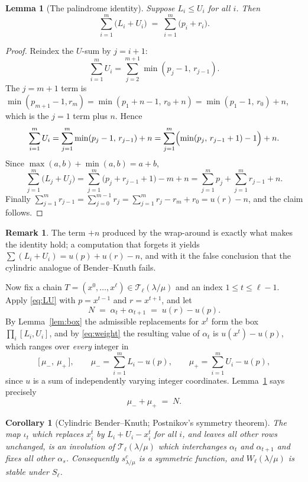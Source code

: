 \documentclass[11pt]{article}
\theoremstyle{plain}
\newtheorem{lem}[thm]{Lemma}
\newtheorem{cor}[thm]{Corollary}
\theoremstyle{definition}
\newtheorem{rem}[thm]{Remark}
\begin{document}
\begin{lem}[The palindrome identity]\label{lem:palindrome}
Suppose $L_i\le U_i$ for all $i$. Then
\[
  \sum_{i=1}^{m}\bigl(L_i+U_i\bigr)\;=\;\sum_{i=1}^{m}\bigl(p_i+r_i\bigr).
\]
\end{lem}

\begin{proof}
Reindex the $U$-sum by $j=i+1$:
\[
  \sum_{i=1}^{m}U_i=\sum_{j=2}^{m+1}\min(p_j-1,\,r_{j-1}).
\]
The $j=m+1$ term is $\min(p_{m+1}-1,r_m)=\min(p_1+n-1,\,r_0+n)=\min(p_1-1,\,r_0)+n$, which is
the $j=1$ term plus $n$. Hence
\[
  \sum_{i=1}^{m}U_i=\sum_{j=1}^{m}\min(p_j-1,\,r_{j-1})+n
   =\sum_{j=1}^{m}\Bigl(\min(p_j,\,r_{j-1}+1)-1\Bigr)+n .
\]
Since $\max(a,b)+\min(a,b)=a+b$,
\[
  \sum_{j=1}^{m}\bigl(L_j+U_j\bigr)
  =\sum_{j=1}^{m}\bigl(p_j+r_{j-1}+1\bigr)-m+n
  =\sum_{j=1}^{m}p_j+\sum_{j=1}^{m}r_{j-1}+n .
\]
Finally $\sum_{j=1}^{m}r_{j-1}=\sum_{j=0}^{m-1}r_j=\sum_{j=1}^{m}r_j-r_m+r_0=u(r)-n$, and the
claim follows.
\end{proof}

\begin{rem}
The term $+n$ produced by the wrap-around is exactly what makes the identity hold; a
computation that forgets it yields $\sum(L_i+U_i)=u(p)+u(r)-n$, and with it the false
conclusion that the cylindric analogue of Bender--Knuth fails.
\end{rem}

Now fix a chain $T=(x^0,\dots,x^\ell)\in\mathcal{T}_\ell(\lambda/\mu)$ and an index
$1\le t\le \ell-1$. Apply \eqref{eq:LU} with $p=x^{t-1}$ and $r=x^{t+1}$, and let
\[
  N\;=\;\alpha_t+\alpha_{t+1}\;=\;u(r)-u(p).
\]
By Lemma~\ref{lem:box} the admissible replacements for $x^{t}$ form the box
$\prod_i[L_i,U_i]$, and by \eqref{eq:weight} the resulting value of $\alpha_t$ is
$u(x^t)-u(p)$, which ranges over \emph{every} integer in
\[
  \bigl[\,\mu_-,\ \mu_+\,\bigr],\qquad
  \mu_-=\textstyle\sum_{i=1}^{m}L_i-u(p),\qquad
  \mu_+=\textstyle\sum_{i=1}^{m}U_i-u(p),
\]
since $u$ is a sum of independently varying integer coordinates. Lemma~\ref{lem:palindrome}
says precisely
\begin{equation}\label{eq:pal}
  \mu_-+\mu_+\;=\;N .
\end{equation}

\begin{cor}[Cylindric Bender--Knuth; Postnikov's symmetry theorem]\label{cor:bk}
The map $\iota_t$ which replaces $x^{t}_i$ by $L_i+U_i-x^{t}_i$ for all $i$, and leaves all
other rows unchanged, is an involution of $\mathcal{T}_\ell(\lambda/\mu)$ which interchanges
$\alpha_t$ and $\alpha_{t+1}$ and fixes all other $\alpha_s$. Consequently
$s^{c}_{\lambda/\mu}$ is a symmetric function, and $W_\ell(\lambda/\mu)$ is stable under
$S_\ell$.
\end{cor}
\end{document}
